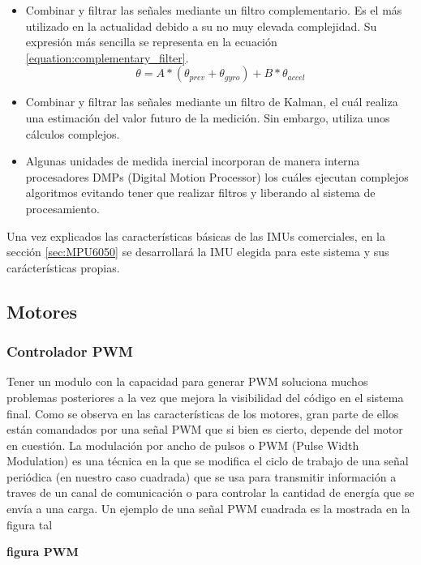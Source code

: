 \begin{itemize}
	\item Combinar y filtrar las señales mediante un filtro complementario. Es el más utilizado en la actualidad debido a su no muy elevada complejidad. Su expresión más sencilla se representa en la ecuación \ref{equation:complementary_filter}.
	\begin{equation} \label{equation:complementary_filter}
		\theta = A * (\theta_{prev}+\theta_{gyro}) + B * \theta_{accel}
	\end{equation}
	\item Combinar y filtrar las señales mediante un filtro de Kalman, el cuál realiza una estimación del valor futuro de la medición. Sin embargo, utiliza unos cálculos complejos. 
	\item Algunas unidades de medida inercial incorporan de manera interna procesadores DMPs (Digital Motion Processor) los cuáles ejecutan complejos algoritmos evitando tener que realizar filtros y liberando al sistema de procesamiento.
\end{itemize}



Una vez explicados las características básicas de las IMUs comerciales, en la sección \ref{sec:MPU6050} se desarrollará la IMU elegida para este sistema y sus carácterísticas propias.

\subsection{Motores}
\subsubsection{Controlador PWM}
Tener un modulo con la capacidad para generar PWM soluciona muchos problemas posteriores a la vez que mejora la visibilidad del código en el sistema final. Como se observa en las características de los motores, gran parte de ellos están comandados por una señal PWM que si bien es cierto, depende del motor en cuestión. \newline
La modulación por ancho de pulsos o PWM (Pulse Width Modulation) es una técnica en la que se modifica el ciclo de trabajo de una señal periódica (en nuestro caso cuadrada) que se usa para transmitir información a traves de un canal de comunicación o para controlar la cantidad de energía que se envía a una carga. Un ejemplo de una señal PWM cuadrada es la mostrada en la figura tal 

\textbf{figura PWM}

